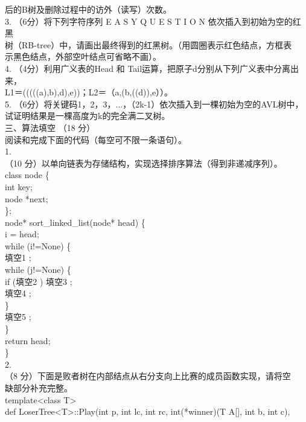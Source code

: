 \begin{question}
后的B树及删除过程中的访外（读写）次数。\\
3. （6分）将下列字符序列 E A S Y Q U E S T I O N 依次插入到初始为空的红黑\\
树（RB-tree）中，请画出最终得到的红黑树。（用圆圈表示红色结点，方框表\\
示黑色结点，外部空叶结点可省略不画）。\\
4. （4分）利用广义表的Head 和 Tail运算，把原子d分别从下列广义表中分离出来，\\
L1＝(((((a),b),d),e))；L2＝（a,(b,((d)),e））。\\
5. （6分）将关键码1，2，3，...，（2k-1）依次插入到一棵初始为空的AVL树中，\\
试证明结果是一棵高度为k的完全满二叉树。\\
三、算法填空 （18 分）\\
阅读和完成下面的代码（每空可不限一条语句）。\\
1.\\
（10 分）以单向链表为存储结构，实现选择排序算法（得到非递减序列）。\\
class node \{\\
int key;\\
node *next;\\
\};\\
node* sort\_linked\_list(node* head) \{\\
i = head;\\
while (i!=None) \{\\
填空1 \underline{\hspace{12em}};\\
while (j!=None) \{\\
if (填空2 \underline{\hspace{12em}})   填空3 \underline{\hspace{12em}};\\
填空4 \underline{\hspace{12em}};\\
\}\\
填空5 \underline{\hspace{12em}};\\
\}\\
return head;\\
\}\\
2.\\
（8 分）下面是败者树在内部结点从右分支向上比赛的成员函数实现，请将空\\
缺部分补充完整。\\
template<class T>\\
def LoserTree<T>::Play(int p, int lc, int rc, int(*winner)(T A[], int b, int c),\\

\end{question}

